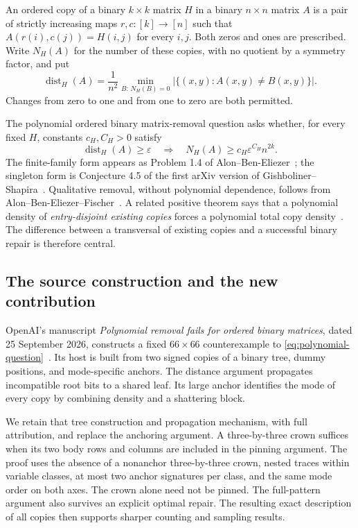 \documentclass[11pt]{article}
\theoremstyle{definition}
\newcommand{\eps}{\varepsilon}
\newcommand{\dist}{\operatorname{dist}}
\begin{document}
An ordered copy of a binary \(k\times k\) matrix \(H\) in a binary
\(n\times n\) matrix \(A\) is a pair of strictly increasing maps
\(r,c:[k]\to[n]\) such that \(A(r(i),c(j))=H(i,j)\) for every \(i,j\).
Both zeros and ones are prescribed. Write \(N_H(A)\) for the number of
these copies, with no quotient by a symmetry factor, and put
\begin{equation}
 \dist_H(A)=\frac{1}{n^2}\min_{B:\,N_H(B)=0}
       |\{(x,y):A(x,y)\ne B(x,y)\}|.
 \label{eq:distance-definition}
\end{equation}
Changes from zero to one and from one to zero are both permitted.

The polynomial ordered binary matrix-removal question asks whether, for
every fixed \(H\), constants \(c_H,C_H>0\) satisfy
\begin{equation}
 \dist_H(A)\ge\eps
 \quad\Longrightarrow\quad
 N_H(A)\ge c_H\eps^{C_H}n^{2k}.
 \label{eq:polynomial-question}
\end{equation}
The finite-family form appears as Problem 1.4 of
Alon--Ben-Eliezer~\cite{AB2020}; the singleton form is Conjecture 4.5
of the first arXiv version of Gishboliner--Shapira~\cite{GS2025}.
Qualitative removal, without polynomial dependence, follows from
Alon--Ben-Eliezer--Fischer~\cite{ABF2017}. A related positive theorem says
that a polynomial density of \emph{entry-disjoint existing copies}
forces a polynomial total copy density~\cite[Theorem 1.2]{AB2020}.
The difference between a transversal of existing copies and a successful
binary repair is therefore central.

\subsection{The source construction and the new contribution}

OpenAI's manuscript \emph{Polynomial removal fails for ordered binary
matrices}, dated 25 September 2026, constructs a fixed \(66\times66\)
counterexample to \eqref{eq:polynomial-question}~\cite{OAI190}.
Its host is built from two signed copies of a binary tree, dummy positions,
and mode-specific anchors. The distance argument propagates incompatible
root bits to a shared leaf. Its large anchor identifies the mode of every
copy by combining density and a shattering block.

We retain that tree construction and propagation mechanism, with full
attribution, and replace the anchoring argument. A three-by-three crown
suffices when its two body rows and columns are included in the pinning
argument. The proof uses the absence of a nonanchor three-by-three crown,
nested traces within variable classes, at most two anchor signatures per
class, and the same mode order on both axes. The crown alone need not be
pinned. The full-pattern argument also survives an explicit optimal repair.
The resulting exact description of all copies then supports sharper
counting and sampling results.
\end{document}
